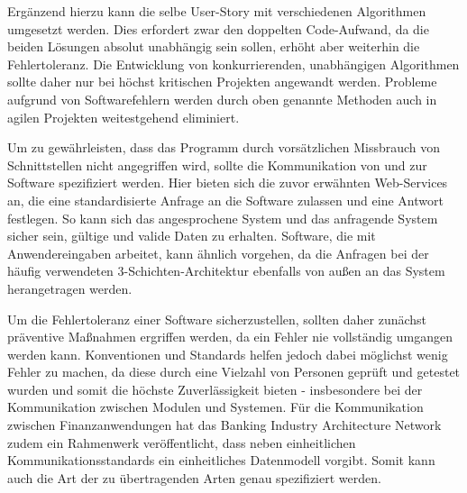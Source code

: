                 Ergänzend hierzu kann die selbe User-Story mit verschiedenen Algorithmen umgesetzt werden. Dies erfordert zwar den doppelten Code-Aufwand, da die beiden Lösungen absolut unabhängig sein sollen, erhöht aber weiterhin die Fehlertoleranz. Die Entwicklung von konkurrierenden, unabhängigen Algorithmen sollte daher nur bei höchst kritischen Projekten angewandt werden.
                Probleme aufgrund von Softwarefehlern werden durch oben genannte Methoden auch in agilen Projekten weitestgehend eliminiert.

                Um zu gewährleisten, dass das Programm durch vorsätzlichen Missbrauch von Schnittstellen nicht angegriffen wird, sollte die Kommunikation von und zur Software spezifiziert werden. Hier bieten sich die zuvor erwähnten Web-Services an, die eine standardisierte Anfrage an die Software zulassen und eine Antwort festlegen. So kann sich das angesprochene System und das anfragende System sicher sein, gültige und valide Daten zu erhalten. Software, die mit Anwendereingaben arbeitet, kann ähnlich vorgehen, da die Anfragen bei der häufig verwendeten 3-Schichten-Architektur ebenfalls von außen an das System herangetragen werden.

                Um die Fehlertoleranz einer Software sicherzustellen, sollten daher zunächst präventive Maßnahmen ergriffen werden, da ein Fehler nie vollständig umgangen werden kann. Konventionen und Standards helfen jedoch dabei möglichst wenig Fehler zu machen, da diese durch eine Vielzahl von Personen geprüft und getestet wurden und somit die höchste Zuverlässigkeit bieten - insbesondere bei der Kommunikation zwischen Modulen und Systemen. Für die Kommunikation zwischen Finanzanwendungen hat das Banking Industry Architecture Network zudem ein Rahmenwerk veröffentlicht, dass neben einheitlichen Kommunikationsstandards ein einheitliches Datenmodell vorgibt. Somit kann auch die Art der zu übertragenden Arten genau spezifiziert werden. 